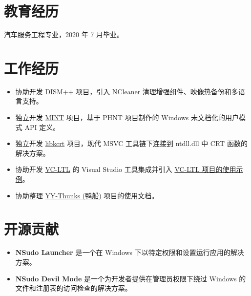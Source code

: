 \documentclass{resume}
\begin{document}
\renewcommand\headrulewidth{0pt}



\section{教育经历}

  汽车服务工程专业，2020 年 7 月毕业。

\section{工作经历}


\begin{itemize}
  \item 协助开发 \href{http://www.chuyu.me/zh-Hans/index.html}{DISM++} 项目，引入 NCleaner 清理增强组件、映像热备份和多语言支持。
  \item 独立开发 \href{https://github.com/Chuyu-Team/MINT}{MINT} 项目，基于 PHNT 项目制作的 Windows 未文档化的用户模式 API 定义。
  \item 独立开发 \href{https://github.com/Chuyu-Team/libkcrt}{libkcrt} 项目，现代 MSVC 工具链下连接到 ntdll.dll 中 CRT 函数的解决方案。
  \item 协助开发 \href{https://github.com/Chuyu-Team/VC-LTL}{VC-LTL} 的 Visual Studio 工具集成并引入 \href{https://github.com/Chuyu-Team/vc-ltl-samples}{VC-LTL 项目的使用示例}。
  \item 协助整理 \href{https://github.com/Chuyu-Team/YY-Thunks}{YY-Thunks (鸭船)} 项目的使用文档。
\end{itemize}

\section{开源贡献}

\role {项目作者}{系统管理员工具集}
\begin{itemize}
  \item \textbf{NSudo Launcher} 是一个在 Windows 下以特定权限和设置运行应用的解决方案。
  \item \textbf{NSudo Devil Mode} 是一个为开发者提供在管理员权限下绕过 Windows 的文件和注册表的访问检查的解决方案。
\end{itemize}
\end{document}
